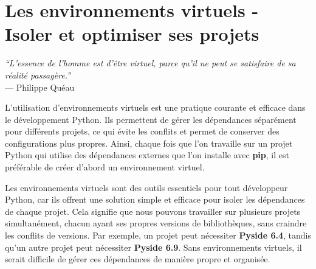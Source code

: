 \chapter[Les environnements virtuels]{Les environnements virtuels - Isoler et optimiser ses projets}

\begin{flushright}
    \begin{minipage}{0.5\textwidth}
    \begin{mdframed}[
        linewidth=0.5pt, %
        roundcorner=5pt, %
        shadow=false, %
        shadowsize=0pt, %
        backgroundcolor=gray!10, %
        frametitleaboveskip=0pt, %
        frametitlebelowskip=0pt, %
        frametitlebackgroundcolor=white, %
        frametitlerule=true, %
        frametitlefont=\normalfont, %
        frametitlealignment=\raggedright %
        width=0.5\textwidth %
    ]
    \textit{``L'essence de l'homme est d'être virtuel, parce qu'il ne peut se satisfaire de sa réalité passagère.''} \\
    \textmd{--- Philippe Quéau}
    \end{mdframed}
    \end{minipage}
\end{flushright}

L'utilisation d'environnements virtuels est une pratique courante et efficace dans le développement Python. Ils permettent de gérer les dépendances séparément pour différents projets, ce qui évite les conflits et permet de conserver des configurations plus propres. Ainsi, chaque fois que l'on travaille sur un projet Python qui utilise des dépendances externes que l'on installe avec \textbf{pip}, il est préférable de créer d'abord un environnement virtuel.

Les environnements virtuels sont des outils essentiels pour tout développeur Python, car ils offrent une solution simple et efficace pour isoler les dépendances de chaque projet. Cela signifie que nous pouvons travailler sur plusieurs projets simultanément, chacun ayant ses propres versions de bibliothèques, sans craindre les conflits de versions. Par exemple, un projet peut nécessiter \textbf{Pyside 6.4}, tandis qu'un autre projet peut nécessiter \textbf{Pyside 6.9}. Sans environnements virtuels, il serait difficile de gérer ces dépendances de manière propre et organisée.

